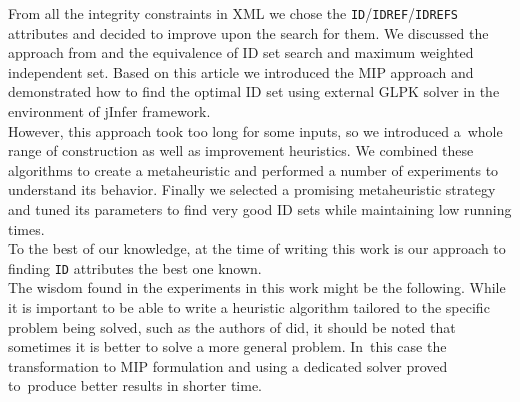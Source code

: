 
From all the integrity constraints in XML we chose the \texttt{ID}/\.\texttt{IDREF}/\.\texttt{IDREFS} attributes and decided to improve upon the search for them. We discussed the approach from \cite{fidax} and the equivalence of ID set search and maximum weighted independent set. Based on this article we introduced the MIP approach and demonstrated how to find the optimal ID set using external GLPK solver in the environment of jInfer framework.\\

However, this approach took too long for some inputs, so we introduced a~whole range of construction as well as improvement heuristics. We combined these algorithms to create a metaheuristic and performed a number of experiments to understand its behavior. Finally we selected a promising metaheuristic strategy and tuned its parameters to find very good ID sets while maintaining low running times.\\

To the best of our knowledge, at the time of writing this work is our approach to finding \texttt{ID} attributes the best one known.\\

The wisdom found in the experiments in this work might be the following. While it is important to be able to write a heuristic algorithm tailored to the specific problem being solved, such as the authors of \cite{fidax} did, it should be noted that sometimes it is better to solve a more general problem. In~this case the transformation to MIP formulation and using a dedicated solver proved to~produce better results in shorter time.